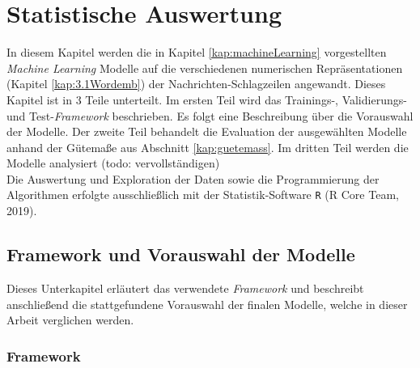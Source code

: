 \documentclass[a4paper,11pt]{article}
\begin{document}
\section{Statistische Auswertung}\label{Kap:statAus}

In diesem Kapitel werden die in Kapitel \ref{kap:machineLearning} vorgestellten \textit{Machine Learning} Modelle auf die verschiedenen numerischen Repräsentationen (Kapitel \ref{kap:3.1Wordemb}) der Nachrichten-Schlagzeilen angewandt. Dieses Kapitel ist in $3$ Teile unterteilt. Im ersten Teil wird das Trainings-, Validierungs- und Test-\textit{Framework} beschrieben. Es folgt eine Beschreibung über die Vorauswahl der Modelle. Der zweite Teil behandelt die Evaluation der ausgewählten Modelle anhand der Gütemaße aus Abschnitt \ref{kap:guetemass}. Im dritten Teil werden die Modelle analysiert (todo: vervollständigen)\\
Die Auswertung und Exploration der Daten sowie die Programmierung der Algorithmen erfolgte ausschließlich mit der Statistik-Software \texttt{R} (R Core Team, 2019).

\subsection{Framework und Vorauswahl der Modelle}

Dieses Unterkapitel erläutert das verwendete \textit{Framework} und beschreibt anschließend die stattgefundene Vorauswahl der finalen Modelle, welche in dieser Arbeit verglichen werden.

\subsubsection{Framework}
\end{document}
